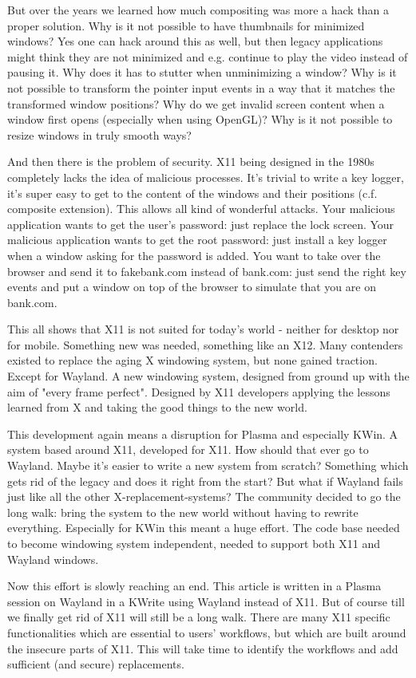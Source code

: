 But over the years we learned how much compositing was more a hack than a proper solution. Why is it not possible to have thumbnails for minimized windows? Yes one can hack around this as well, but then legacy applications might think they are not minimized and e.g. continue to play the video instead of pausing it. Why does it has to stutter when unminimizing a window? Why is it not possible to transform the pointer input events in a way that it matches the transformed window positions? Why do we get invalid screen content when a window first opens (especially when using OpenGL)? Why is it not possible to resize windows in truly smooth ways?

And then there is the problem of security. X11 being designed in the 1980s completely lacks the idea of malicious processes. It's trivial to write a key logger, it's super easy to get to the content of the windows and their positions (c.f. composite extension). This allows all kind of wonderful attacks. Your malicious application wants to get  the user's password: just replace the lock screen. Your malicious application wants to get the root password: just install a key logger when a window asking for the password is added. You want to take over the browser and send it to fakebank.com instead of bank.com: just send the right key events and put a window on top of the browser to simulate that you are on bank.com.

This all shows that X11 is not suited for today's world - neither for desktop nor for mobile. Something new was needed, something like an X12. Many contenders existed to replace the aging X windowing system, but none gained traction. Except for Wayland. A new windowing system, designed from ground up with the aim of "every frame perfect". Designed by X11 developers applying the lessons learned from X and taking the good things to the new world.

This development again means a disruption for Plasma and especially KWin. A system based around X11, developed for X11. How should that ever go to Wayland. Maybe it's easier to write a new system from scratch? Something which gets rid of the legacy and does it right from the start? But what if Wayland fails just like all the other X-replacement-systems? The community decided to go the long walk: bring the system to the new world without having to rewrite everything. Especially for KWin this meant a huge effort. The code base needed to become windowing system independent, needed to support both X11 and Wayland windows.

Now this effort is slowly reaching an end. This article is written in a Plasma session on Wayland in a KWrite using Wayland instead of X11. But of course till we finally get rid of X11 will still be a long walk. There are many X11 specific functionalities which are essential to users' workflows, but which are built around the insecure parts of X11. This will take time to identify the workflows and add sufficient (and secure) replacements.
